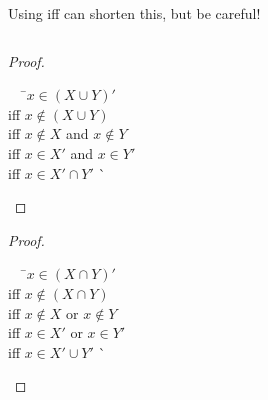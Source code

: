 \documentclass[../notes.tex]{subfiles}
\begin{document}
			Using iff can shorten this, but be careful!
			\begin{example}
				$ $\\
				\begin{minipage}{0.4\textwidth}
					\begin{proof}
						$ $
						\begin{tabbing}
							$\quad$ \=$x \in (X \cup Y)'$\\
							iff \>$x \notin (X \cup Y)$\\
							iff \>$x \notin X$ and $x \notin Y$\\
							iff \>$x \in X'$ and $x \in Y'$\\
							iff \>$x \in X' \cap Y'$ \` \qedhere
						\end{tabbing}
					\end{proof}
				\end{minipage}
				\hfill
				\begin{minipage}{0.4\textwidth}
					\begin{proof}
						$ $ 
						\begin{tabbing}
							$\quad$ \=$x \in (X \cap Y)'$\\
							iff \> $x \notin (X \cap Y)$\\
							iff \> $x \notin X$ or $x \notin Y$\\
							iff \> $x \in X'$ or $x \in Y'$\\
							iff \> $x \in X' \cup Y'$ \` \qedhere
						\end{tabbing}
					\end{proof}
				\end{minipage}
			\end{example}
			\pagebreak
\end{document}
